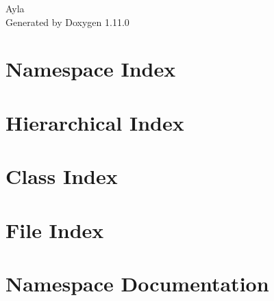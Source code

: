 \documentclass[twoside]{book}
\newcommand{\+}{\discretionary{\mbox{\scriptsize$\hookleftarrow$}}{}{}}
\newcommand{\clearemptydoublepage}{%
    \newpage{\pagestyle{empty}\cleardoublepage}%
  }
\begin{document}
  \raggedbottom
    \hypersetup{pageanchor=false,
                bookmarksnumbered=true,
                pdfencoding=unicode
               }
  \begin{titlepage}
  \vspace*{7cm}
  \begin{center}%
  {\Large Ayla}\\
  \vspace*{1cm}
  {\large Generated by Doxygen 1.11.0}\\
  \end{center}
  \end{titlepage}
  \clearemptydoublepage
  \tableofcontents
  \clearemptydoublepage
  \hypersetup{pageanchor=true}
\chapter{Namespace Index}

\chapter{Hierarchical Index}

\chapter{Class Index}

\chapter{File Index}

\chapter{Namespace Documentation}



\end{document}
